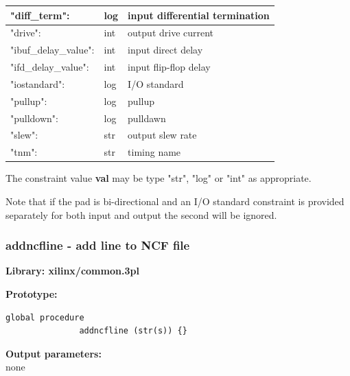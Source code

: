             \begin{tabular}{| l | l | l |}
            \hline
            "diff\_term":           & log & input differential termination \\ \hline
            "drive":                & int & output drive current           \\ \hline
            "ibuf\_delay\_value":   & int & input direct delay             \\ \hline
            "ifd\_delay\_value":    & int & input flip-flop delay          \\ \hline
            "iostandard":           & log & I/O standard                   \\ \hline
            "pullup":               & log & pullup                         \\ \hline
            "pulldown":             & log & pulldawn                       \\ \hline
            "slew":                 & str & output slew rate               \\ \hline
            "tnm":                  & str & timing name                    \\ \hline
            \end{tabular}
            
            The constraint value {\bf val} may be type "str", "log" or "int"
            as appropriate.

            Note that if the pad is bi-directional and an I/O standard constraint
            is provided separately for both input and output the second will be
            ignored.



        \subsubsection{addncfline - add line to NCF file}\label{sec:lpaddncfline}
            
            {\bf Library: xilinx/common.3pl}

            {\bf Prototype:} \\
            \vsp
            \begin{lstlisting}[gobble=12, language=threepl]
               global procedure
               addncfline (str(s)) {}
            \end{lstlisting}

            {\bf Output parameters:} \\
            none

